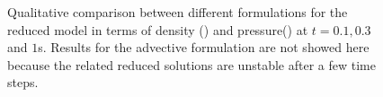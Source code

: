 \begin{figure}
\begin{subfigure}[]{0.47\linewidth}
\caption{}
\label{pressure_reduction_1D}
\end{subfigure}
\caption{Qualitative comparison between different formulations for the reduced model in terms of density (\protect{})  and pressure(\protect{}) at $t=0.1,0.3$ and $1$s. Results for the advective formulation are not showed here because the related reduced solutions are unstable after a few time steps.}
\label{fig:snaps_1D_Euler}
\end{figure}

